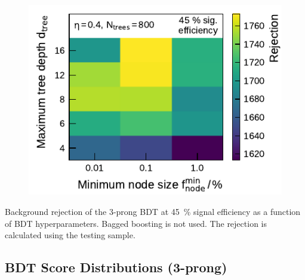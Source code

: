 \begin{minipage}{\textwidth}
\begin{subfigure}[t]{0.48\textwidth}
  \end{subfigure}\hfill
  \begin{subfigure}[t]{0.48\textwidth}
    \centering
    \includegraphics{./figures/bdt_perf/gridsearch_3p/scan_MinNodeSize_MaxDepth.pdf}
  \end{subfigure}
  \caption[Background rejection as a function of BDT hyperparameters
  (3-prong)]{Background rejection of the 3-prong BDT at \SI{45}{\percent} signal
    efficiency as a function of BDT hyperparameters. Bagged boosting is not
    used. The rejection is calculated using the testing sample.}
  \label{fig:hyperparameter_scan_3p}
\end{minipage}

\FloatBarrier
\subsection{BDT Score Distributions (3-prong)}
\label{app:bdt_stuff}

